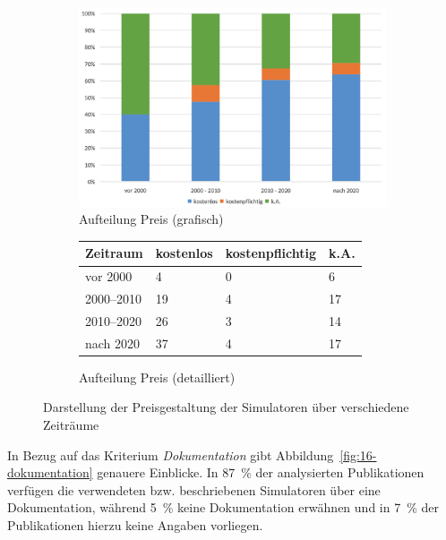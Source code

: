 \begin{figure}[!htbp]
    \centering
    \begin{subfigure}[b]{0.48\textwidth}
        \centering
        \includegraphics[width=\textwidth]{graphics_lit/15-preis-jahr.png}
        \caption{Aufteilung Preis (grafisch)}
        \label{fig:15-preis-jahr}
    \end{subfigure}
    \hfill
    \begin{subfigure}[b]{0.48\textwidth}
        \centering
        \tiny
        \begin{tabularx}{\textwidth}{lXXX}
            \hline
            \textbf{Zeitraum} & \textbf{kostenlos} & \textbf{kostenpflichtig} & \textbf{k.A.} \\
            \hline
            vor 2000      & 4  & 0 & 6  \\
            2000--2010    & 19 & 4 & 17 \\
            2010--2020    & 26 & 3 & 14 \\
            nach 2020     & 37 & 4 & 17 \\
            \hline
        \end{tabularx}
        \caption{Aufteilung Preis (detailliert)}
        \label{tab:15-preis-zeit}
    \end{subfigure}
    \caption{Darstellung der Preisgestaltung der Simulatoren über verschiedene Zeiträume}
    \label{fig:15-preis-gesamt}
\end{figure}

In Bezug auf das Kriterium \textit{Dokumentation} gibt Abbildung~\ref{fig:16-dokumentation} genauere Einblicke. In 87~\% der analysierten Publikationen verfügen die verwendeten bzw. beschriebenen Simulatoren über eine Dokumentation, während 5~\% keine Dokumentation erwähnen und in 7~\% der Publikationen hierzu keine Angaben vorliegen.


